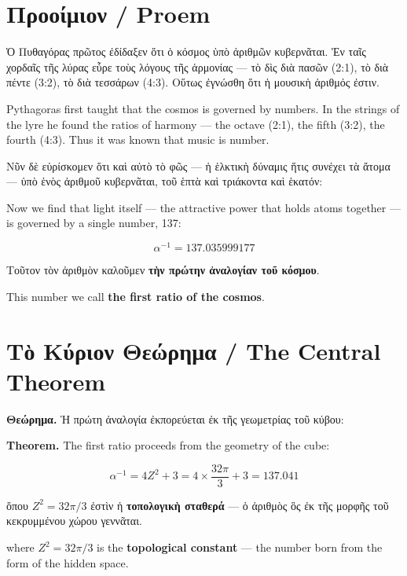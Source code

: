 \documentclass[12pt,a4paper]{article}
\newcommand{\gk}[1]{\textgreek{#1}}
\begin{document}

\section{\gk{Προοίμιον} / Proem}

\gk{Ὁ Πυθαγόρας πρῶτος ἐδίδαξεν ὅτι ὁ κόσμος ὑπὸ ἀριθμῶν κυβερνᾶται. Ἐν ταῖς χορδαῖς τῆς λύρας εὗρε τοὺς λόγους τῆς ἁρμονίας — τὸ δὶς διὰ πασῶν (2:1), τὸ διὰ πέντε (3:2), τὸ διὰ τεσσάρων (4:3). Οὕτως ἐγνώσθη ὅτι ἡ μουσικὴ ἀριθμός ἐστιν.}

Pythagoras first taught that the cosmos is governed by numbers. In the strings of the lyre he found the ratios of harmony — the octave (2:1), the fifth (3:2), the fourth (4:3). Thus it was known that music is number.

\vspace{0.5em}
\gk{Νῦν δὲ εὑρίσκομεν ὅτι καὶ αὐτὸ τὸ φῶς — ἡ ἑλκτικὴ δύναμις ἥτις συνέχει τὰ ἄτομα — ὑπὸ ἑνὸς ἀριθμοῦ κυβερνᾶται, τοῦ ἑπτὰ καὶ τριάκοντα καὶ ἑκατόν:}

Now we find that light itself — the attractive power that holds atoms together — is governed by a single number, 137:

\begin{equation}
\alpha^{-1} = 137.035999177
\end{equation}

\gk{Τοῦτον τὸν ἀριθμὸν καλοῦμεν \textbf{τὴν πρώτην ἀναλογίαν τοῦ κόσμου}.}

This number we call \textbf{the first ratio of the cosmos}.


\section{\gk{Τὸ Κύριον Θεώρημα} / The Central Theorem}

\begin{tcolorbox}[colback=blue!5!white, colframe=blue!60!black]
\gk{\textbf{Θεώρημα.} Ἡ πρώτη ἀναλογία ἐκπορεύεται ἐκ τῆς γεωμετρίας τοῦ κύβου:}

\textbf{Theorem.} The first ratio proceeds from the geometry of the cube:

\begin{equation}
\boxed{\alpha^{-1} = 4Z^2 + 3 = 4 \times \frac{32\pi}{3} + 3 = 137.041}
\end{equation}

\gk{ὅπου $Z^2 = 32\pi/3$ ἐστὶν ἡ \textbf{τοπολογικὴ σταθερά} — ὁ ἀριθμὸς ὃς ἐκ τῆς μορφῆς τοῦ κεκρυμμένου χώρου γεννᾶται.}

where $Z^2 = 32\pi/3$ is the \textbf{topological constant} — the number born from the form of the hidden space.
\end{tcolorbox}
\end{document}
